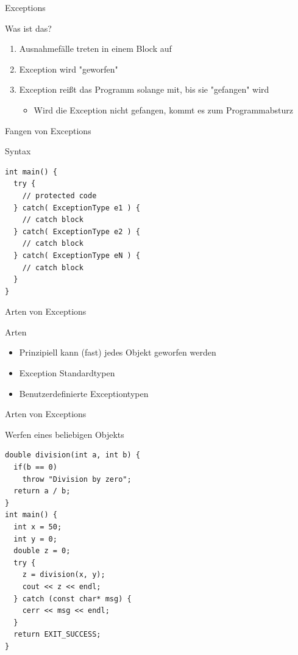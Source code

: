 \documentclass[presentation]{beamer}
\begin{document}
\begin{frame}[fragile,label=sec-1-1]{Exceptions}
\begin{block}{Was ist das?}
\begin{enumerate}
	\item Ausnahmefälle treten in einem Block auf
	\item Exception wird "geworfen"
	\item Exception reißt das Programm solange mit, bis sie "gefangen" wird
	\begin{itemize}
		\item Wird die Exception nicht gefangen, kommt es zum Programmabsturz
	\end{itemize}
\end{enumerate}
\end{block}

\end{frame}

\begin{frame}[fragile,label=sec-1-1]{Fangen von Exceptions}
\begin{exampleblock}{Syntax}
\begin{verbatim}
int main() {
  try {
    // protected code
  } catch( ExceptionType e1 ) {
    // catch block
  } catch( ExceptionType e2 ) {
    // catch block
  } catch( ExceptionType eN ) {
    // catch block
  }
}
\end{verbatim}
\end{exampleblock}

\end{frame}

\begin{frame}[fragile,label=sec-1-1]{Arten von Exceptions}
\begin{block}{Arten}
\begin{itemize}
	\item Prinzipiell kann (fast) jedes Objekt geworfen werden
	\item Exception Standardtypen
	\item Benutzerdefinierte Exceptiontypen
\end{itemize}
\end{block}

\end{frame}

\begin{frame}[fragile,label=sec-1-1]{Arten von Exceptions}
\begin{exampleblock}{Werfen eines beliebigen Objekts}
\begin{verbatim}
double division(int a, int b) {
  if(b == 0)
    throw "Division by zero";
  return a / b;
}
int main() {
  int x = 50;
  int y = 0;
  double z = 0;
  try {
    z = division(x, y);
    cout << z << endl;
  } catch (const char* msg) {
    cerr << msg << endl;
  }
  return EXIT_SUCCESS;
}
\end{verbatim}
\end{exampleblock}

\end{frame}
\end{document}
